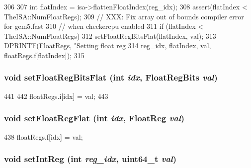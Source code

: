 \begin{DoxyCode}
306     {
307         int flatIndex = isa->flattenFloatIndex(reg_idx);
308         assert(flatIndex < TheISA::NumFloatRegs);
309         // XXX: Fix array out of bounds compiler error for gem5.fast
310         // when checkercpu enabled
311         if (flatIndex < TheISA::NumFloatRegs)
312             setFloatRegBitsFlat(flatIndex, val);
313         DPRINTF(FloatRegs, "Setting float reg %
314                 reg_idx, flatIndex, val, floatRegs.f[flatIndex]);
315     }
\end{DoxyCode}
\hypertarget{classSimpleThread_acd974292ff0461c2e94c0b5a1126b503}{
\subsubsection[{setFloatRegBitsFlat}]{\setlength{\rightskip}{0pt plus 5cm}void setFloatRegBitsFlat (int {\em idx}, \/  {\bf FloatRegBits} {\em val})}}
\label{classSimpleThread_acd974292ff0461c2e94c0b5a1126b503}



\begin{DoxyCode}
441                                                         {
442         floatRegs.i[idx] = val;
443     }
\end{DoxyCode}
\hypertarget{classSimpleThread_a71ec23ca2c029120932e5af4babc0da1}{
\subsubsection[{setFloatRegFlat}]{\setlength{\rightskip}{0pt plus 5cm}void setFloatRegFlat (int {\em idx}, \/  {\bf FloatReg} {\em val})}}
\label{classSimpleThread_a71ec23ca2c029120932e5af4babc0da1}



\begin{DoxyCode}
438 { floatRegs.f[idx] = val; }
\end{DoxyCode}
\hypertarget{classSimpleThread_abc264e8ee37c6bd7d7b5759b97c34356}{
\subsubsection[{setIntReg}]{\setlength{\rightskip}{0pt plus 5cm}void setIntReg (int {\em reg\_\-idx}, \/  uint64\_\-t {\em val})}}
\label{classSimpleThread_abc264e8ee37c6bd7d7b5759b97c34356}



